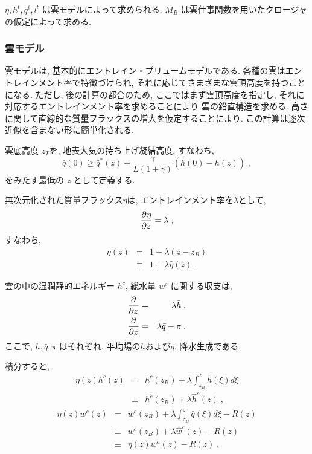 $\eta, h^t, q^t, l^t$ は雲モデルによって求められる.
$M_B$ は雲仕事関数を用いたクロージャの仮定によって求める.

\subsubsection{雲モデル}

雲モデルは, 基本的にエントレイン・プリュームモデルである.
各種の雲はエントレインメント率で特徴づけられ,
それに応じてさまざまな雲頂高度を持つことになる.
ただし, 後の計算の都合のため, 
ここではまず雲頂高度を指定し, 
それに対応するエントレインメント率を求めることにより
雲の鉛直構造を求める.
高さに関して直線的な質量フラックスの増大を仮定することにより.
この計算は逐次近似を含まない形に簡単化される.

雲底高度 $z_T$を, 
地表大気の持ち上げ凝結高度, すなわち,
\begin{equation}
   \bar{q}(0) \geq
                \bar{q}^*(z)
                + \frac{\gamma}{L(1+\gamma)} 
                    \left(\bar{h}(0)-\bar{h}(z) \right) \; , 
\end{equation}
をみたす最低の $z$ として定義する.

無次元化された質量フラックス$\eta$は, 
エントレインメント率を$\lambda$として,
\begin{equation}
  \DP{\eta}{z} = \lambda \; ,
\end{equation}
すなわち,
\begin{eqnarray}
  \eta (z) & = & 1 + \lambda ( z - z_B ) \nonumber\\
           & \equiv & 1 + \lambda \hat{\eta}(z)  \; .
\end{eqnarray}

雲の中の湿潤静的エネルギー $h^c$, 総水量 $w^c$ に関する収支は,
\begin{eqnarray}
  \DP{}{z}( \eta h^c   ) & = & \lambda \bar{h}      \; , \\
  \DP{}{z}( \eta w^c   ) & = & \lambda \bar{q} - \pi  \; .
\end{eqnarray}
ここで, $\bar{h}, \bar{q}, \pi$ はそれぞれ,
平均場の$h$および$q$, 降水生成である.

積分すると,
\begin{eqnarray}
   \eta (z) h^c(z) & = & h^c(z_B)
                         + \lambda \int_{z_B}^{z} \bar{h}(\xi) d\xi \nonumber\\
                   & \equiv & h^c(z_B) + \lambda \hat{h}^c(z) \; ,
\end{eqnarray}
\begin{eqnarray}
   \eta (z) w^c(z) & = & w^c(z_B)
                         + \lambda \int_{z_B}^{z} \bar{q}(\xi) d\xi
                         - R(z) \nonumber\\
                   & \equiv & w^c(z_B) + \lambda \hat{w}^c(z) 
                              - R(z)             \nonumber\\
                   & \equiv & \eta(z) w^a(z) - R(z)  \; . 
\end{eqnarray}

